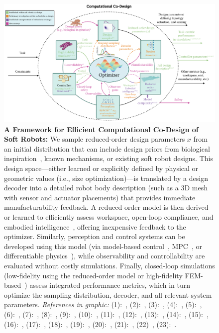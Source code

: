 \begin{figure}[h!]
    \centering
    \includegraphics[width=1\linewidth]{appendix-holistic-codesign/figures/efficient_computation_co_design_optimized.pdf}
    \caption{\textbf{A Framework for Efficient Computational Co-Design of Soft Robots:}
        We sample reduced-order design parameters $x$ from an initial distribution that can include design priors from biological inspiration~\citep{mazzolai2020vision, chen2020design, laschi2024bioinspiration}, known mechanisms, or existing soft robot designs. This design space—either learned or explicitly defined by physical or geometric values (i.e., size optimization)—is translated by a design decoder into a detailed robot body description (such as a 3D mesh with sensor and actuator placements) that provides immediate manufacturability feedback. A reduced-order model is then derived~\citep{alora2023data, stolzle2024input, valadas2025learning, alkayas2025soft} or learned to efficiently assess workspace, open-loop compliance, and embodied intelligence~\citep{cianchetti2021embodied, mengaldo2022concise, vihmar2023measure}, offering inexpensive feedback to the optimizer. Similarly, perception and control systems can be developed using this model (via model-based control~\citep{della2023model}, MPC~\citep{alora2023data}, or differentiable physics~\citep{spielberg2019learning, bacher2021design, wang2023softzoo}), while observability and controllability are evaluated without costly simulations. Finally, closed-loop simulations (low-fidelity using the reduced-order model or high-fidelity FEM-based~\citep{coevoet2017software}) assess integrated performance metrics, which in turn optimize the sampling distribution, decoder, and all relevant system parameters.
        \emph{References in graphic:}  
        (1):~\citep{navez2024contributions}, (2):~\citep{bhatia2021evolution}, (3):~\citep{wang2023softzoo}, (4):~\citep{wang2024diffusebot}, (5):~\citep{song2024morphvae}, (6):~\citep{sutton1998reinforcement}, (7):~\citep{garnett2023bayesian}, (8):~\citep{medvet2022impact}, (9):~\citep{guan2023trimmed}, (10):~\citep{armanini2023soft}, (11):~\citep{valadas2025learning}, (12):~\citep{alkayas2025soft}, (13):~\citep{menager2023direct}, (14):~\citep{alora2023data}, (15):~\citep{spielberg2021co}, (16):~\citep{junge2022leveraging}, (17):~\citep{zheng2019controllability}, (18):~\citep{amehri2022workspace}, (19):~\citep{cianchetti2021embodied}, (20):~\citep{mengaldo2022concise}, (21):~\citep{vihmar2023measure}, (22)~\citep{spielberg2019learning}, (23):~\citep{della2023model}.
}
\end{figure}
